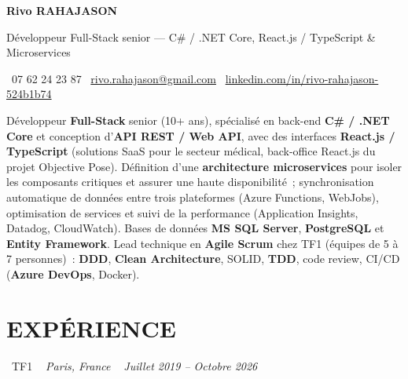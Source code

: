 \documentclass[10pt,a4paper]{article}
\begin{document}
\begin{center}
{\Huge \textbf{\color{ink}Rivo RAHAJASON}}

\vspace{4pt}

{\large \color{primary} Développeur Full-Stack senior --- C\# / .NET Core, React.js / TypeScript \& Microservices}

\vspace{6pt}

\color{darkgray} \faPhone\  07 62 24 23 87 \quad
\color{darkgray} \faEnvelope\ \href{mailto:rivo.rahajason@gmail.com}{rivo.rahajason@gmail.com} \quad
\color{darkgray} \faLinkedin\ \href{https://linkedin.com/in/rivo-rahajason-524b1b74}{linkedin.com/in/rivo-rahajason-524b1b74}

\vspace{10pt}

\begin{minipage}{\textwidth}
\small\color{darkgray}
Développeur \textbf{Full-Stack} senior (10+ ans), spécialisé en back-end \textbf{C\# / .NET Core} et conception d'\textbf{API REST / Web API}, avec des interfaces \textbf{React.js / TypeScript} (solutions SaaS pour le secteur médical, back-office React.js du projet Objective Pose). Définition d'une \textbf{architecture microservices} pour isoler les composants critiques et assurer une haute disponibilité~; synchronisation automatique de données entre trois plateformes (Azure Functions, WebJobs), optimisation de services et suivi de la performance (Application Insights, Datadog, CloudWatch). Bases de données \textbf{MS SQL Server}, \textbf{PostgreSQL} et \textbf{Entity Framework}. Lead technique en \textbf{Agile Scrum} chez TF1 (équipes de 5 à 7 personnes)~: \textbf{DDD}, \textbf{Clean Architecture}, SOLID, \textbf{TDD}, code review, CI/CD (\textbf{Azure DevOps}, Docker).
\end{minipage}

\vspace{16pt}
\end{center}

\section*{EXPÉRIENCE}

\noindent\textcolor{primary}{ \faBuilding\ TF1} \quad
\textit{ \small \textcolor{darkgray}{ \faMapMarker\ } Paris, France } \hfill
\textit{ \small \textcolor{darkgray}{ \faCalendar\ } Juillet 2019 -- Octobre 2026 }
\end{document}
